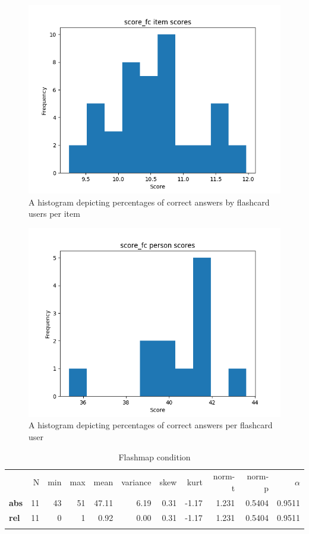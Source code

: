 \begin{figure}
    \includegraphics[width=\textwidth]{img/score_fc_diff.png}
    \caption{A histogram depicting percentages of correct answers by flashcard users per item}
    \label{fig:score_fc_diff}
\end{figure}
\begin{figure}
    \includegraphics[width=\textwidth]{img/score_fc_abil.png}
    \caption{A histogram depicting percentages of correct answers per flashcard user}
    \label{fig:score_fc_abil}
\end{figure}

\begin{longtable}[c]{@{}lrrrrrrrrrr@{}}
\caption{Flashmap condition}
\endfirsthead
\toprule\addlinespace
& N & min & max & mean & variance & skew & kurt & norm-t &
norm-p & $\alpha$
\\\addlinespace
\midrule
\textbf{abs} & 11 & 43 & 51 & 47.11 & 6.19 & 0.31 & -1.17 & 1.231 &
0.5404 & 0.9511
\\\addlinespace
\textbf{rel} & 11 & 0 & 1 & 0.92 & 0.00 & 0.31 & -1.17 & 1.231 & 0.5404
& 0.9511
\\\addlinespace
\bottomrule
    \label{tab:score_fm}
\end{longtable}

